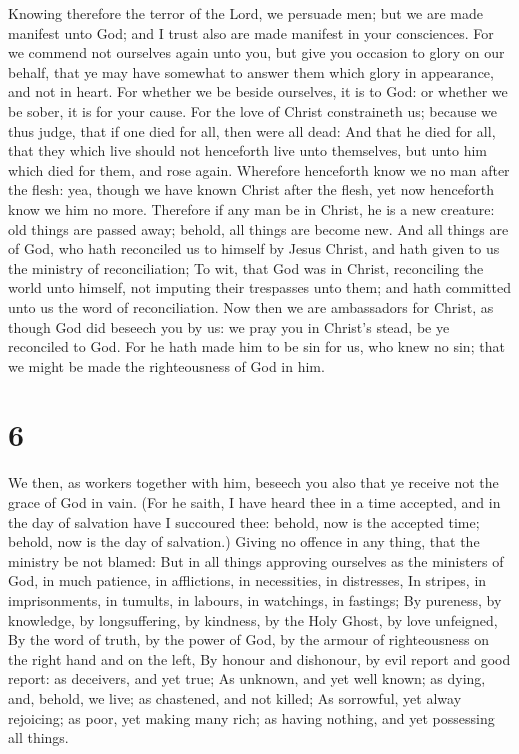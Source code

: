  Knowing therefore the terror of the Lord, we persuade
men; but we are made manifest unto God; and I trust also are made
manifest in your consciences.  For we commend not
ourselves again unto you, but give you occasion to glory on our behalf,
that ye may have somewhat to answer them which glory in appearance, and
not in heart.  For whether we be beside ourselves, it is
to God: or whether we be sober, it is for your cause. 
For the love of Christ constraineth us; because we thus judge, that if
one died for all, then were all dead:  And that he died
for all, that they which live should not henceforth live unto
themselves, but unto him which died for them, and rose again.
 Wherefore henceforth know we no man after the flesh:
yea, though we have known Christ after the flesh, yet now henceforth
know we him no more.  Therefore if any man be in Christ,
he is a new creature: old things are passed away; behold, all things are
become new.  And all things are of God, who hath
reconciled us to himself by Jesus Christ, and hath given to us the
ministry of reconciliation;  To wit, that God was in
Christ, reconciling the world unto himself, not imputing their
trespasses unto them; and hath committed unto us the word of
reconciliation.  Now then we are ambassadors for Christ,
as though God did beseech you by us: we pray you in Christ's stead, be
ye reconciled to God.  For he hath made him to be sin for
us, who knew no sin; that we might be made the righteousness of God in
him.

\hypertarget{section-5}{%
\section{6}\label{section-5}}

 We then, as workers together with him, beseech you also
that ye receive not the grace of God in vain.  (For he
saith, I have heard thee in a time accepted, and in the day of salvation
have I succoured thee: behold, now is the accepted time; behold, now is
the day of salvation.)  Giving no offence in any thing,
that the ministry be not blamed:  But in all things
approving ourselves as the ministers of God, in much patience, in
afflictions, in necessities, in distresses,  In stripes,
in imprisonments, in tumults, in labours, in watchings, in fastings;
 By pureness, by knowledge, by longsuffering, by kindness,
by the Holy Ghost, by love unfeigned,  By the word of
truth, by the power of God, by the armour of righteousness on the right
hand and on the left,  By honour and dishonour, by evil
report and good report: as deceivers, and yet true;  As
unknown, and yet well known; as dying, and, behold, we live; as
chastened, and not killed;  As sorrowful, yet alway
rejoicing; as poor, yet making many rich; as having nothing, and yet
possessing all things.

